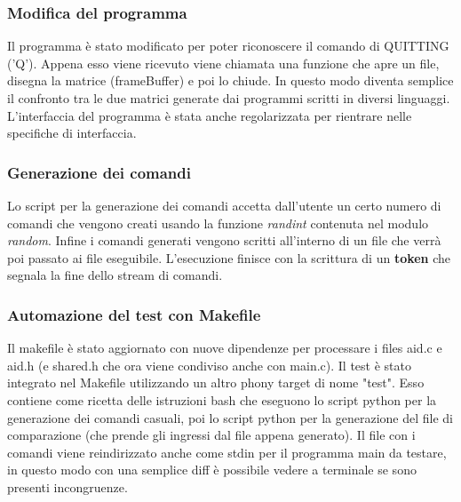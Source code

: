 \documentclass{article}
\begin{document}
	\subsubsection*{Modifica del programma}
		Il programma è stato modificato per poter riconoscere il comando di QUITTING ('Q'). Appena esso viene ricevuto
		viene chiamata una funzione che apre un file, disegna la matrice (frameBuffer) e poi lo chiude. In questo modo 
		diventa semplice il confronto tra le due matrici generate dai programmi scritti in diversi linguaggi.
		L'interfaccia del programma è stata anche regolarizzata per rientrare nelle specifiche di interfaccia.

	\subsubsection*{Generazione dei comandi}
		Lo script per la generazione dei comandi accetta dall'utente un certo numero di comandi che vengono creati usando la funzione \textit{randint} contenuta nel modulo \textit{random}. Infine i comandi generati vengono scritti all'interno di un file che verrà poi passato ai file eseguibile.
		L'esecuzione finisce con la scrittura di un \textbf{token} che segnala la fine dello stream di comandi.

	\subsubsection*{Automazione del test con Makefile}		
		Il makefile è stato aggiornato con nuove dipendenze per processare i files aid.c e aid.h (e shared.h che ora
		viene condiviso anche con main.c).
		Il test è stato integrato nel Makefile utilizzando un altro phony target di nome "test". Esso contiene come
		ricetta delle istruzioni bash che eseguono lo script python per la generazione dei comandi casuali, poi lo script
		python per la generazione del file di comparazione (che prende gli ingressi dal file appena generato). Il file con
		i comandi viene reindirizzato anche come stdin per il programma main da testare, in questo modo con una semplice 
		diff è possibile vedere a terminale se sono presenti incongruenze.
\end{document}
